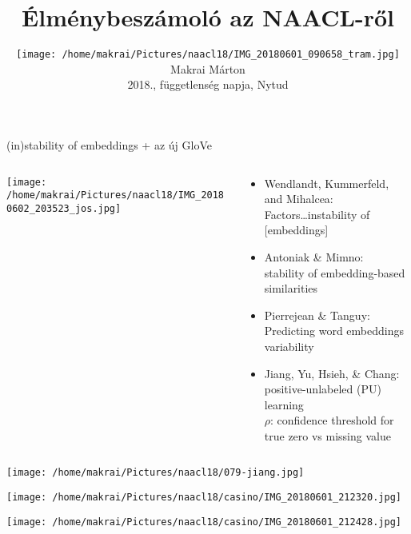 \documentclass{beamer}
\author[Makrai Márton]{
  \texttt{[image: /home/makrai/Pictures/naacl18/IMG\_20180601\_090658\_tram.jpg]} \\
 Makrai Márton \\ 
 2018., függetlenség napja, Nytud}
\date[2018., függetlenség napja]{}
\title{Élménybeszámoló az NAACL-ről}
\begin{document}
      \maketitle

\begin{frame}[allowframebreaks]{(in)stability of embeddings + az új GloVe}
  \begin{columns}\begin{column}{.35\textwidth}\centering
  \texttt{[image: /home/makrai/Pictures/naacl18/IMG\_20180602\_203523\_jos.jpg]}\end{column}\begin{column}{.65\textwidth}
    \begin{itemize}
      \item Wendlandt, Kummerfeld, and Mihalcea: \\  
        Factors\dots  instability of [embeddings]
      \item Antoniak \& Mimno: \\  stability of embedding-based similarities
      \item Pierrejean \& Tanguy: \\  Predicting word embeddings variability 
      \item Jiang, Yu, Hsieh, \& Chang: \\  positive-unlabeled (PU) learning
        \\ $\rho$: confidence threshold for true zero vs missing value 
    \end{itemize}
  \end{column}\end{columns}
        \centering
        \texttt{[image: /home/makrai/Pictures/naacl18/079-jiang.jpg]}
\end{frame}

      \begin{frame}[allowframebreaks]
        \texttt{[image: /home/makrai/Pictures/naacl18/casino/IMG\_20180601\_212320.jpg]}

        \texttt{[image: /home/makrai/Pictures/naacl18/casino/IMG\_20180601\_212428.jpg]}
      \end{frame}
\end{document}
